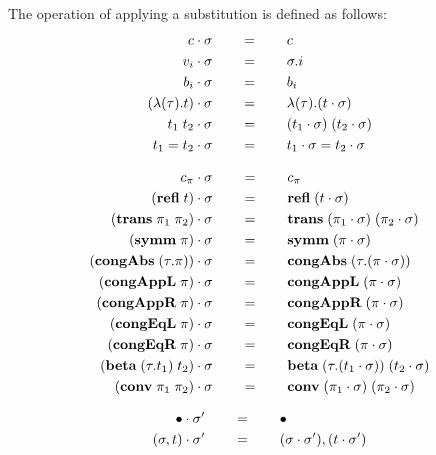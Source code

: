 \documentclass[10pt]{article}
\begin{document}
\begin{mydef}\label{def:stlcd-subst-app}
The operation of applying a substitution is defined as follows:
\\

\begin{align*}
  {c}\cdot{\sigma}      & \qquad = \qquad c\\
  {v_i}\cdot{\sigma}    & \qquad = \qquad \sigma.i\\
  {b_i}\cdot{\sigma}    & \qquad = \qquad b_i\\
  {(\lambda{(\tau)}.{t})}\cdot{\sigma}    & \qquad = \qquad  
    \lambda{(\tau)}.{({t}\cdot{\sigma})}\\
  {t_1\; t_2}\cdot{\sigma}   & \qquad = \qquad
    ({t_1}\cdot{\sigma})\; ({t_2}\cdot{\sigma})\\
  {t_1 = t_2}\cdot{\sigma}   & \qquad = \qquad
    {t_1}\cdot{\sigma} = {t_2}\cdot{\sigma}
\end{align*}

\fbox{$\subst{\pi}{\si}$}
\begin{align*}
  {c_\pi}\cdot{\sigma}      & \qquad = \qquad c_\pi\\
  {(\mbox{\bf refl}\; t)}\cdot{\sigma}       & \qquad = \qquad 
    \mbox{\bf refl}\;({t}\cdot{\sigma})\\
  {(\mbox{\bf trans}\;\pi_1\; \pi_2)}\cdot{\sigma}   & \qquad = \qquad
    \mbox{\bf trans}\;({\pi_1}\cdot{\sigma})\; ({\pi_2}\cdot{\sigma})\\
  {(\mbox{\bf symm}\; \pi)}\cdot{\sigma}  & \qquad = \qquad
    \mbox{\bf symm}\; ({\pi}\cdot{\sigma})\\
  {(\mbox{\bf congAbs}\;(\tau.\pi))}\cdot{\sigma}   & \qquad = \qquad
    \mbox{\bf congAbs}\;(\tau.({\pi}\cdot{\sigma}))\\
  {(\mbox{\bf congAppL}\;\pi)}\cdot{\sigma}  & \qquad = \qquad
    \mbox{\bf congAppL}\;({\pi}\cdot{\sigma})\\
  {(\mbox{\bf congAppR}\;\pi)}\cdot{\sigma}  & \qquad = \qquad
    \mbox{\bf congAppR}\;({\pi}\cdot{\sigma})\\
  {(\mbox{\bf congEqL}\;\pi)}\cdot{\sigma}  & \qquad = \qquad
    \mbox{\bf congEqL}\;({\pi}\cdot{\sigma})\\
  {(\mbox{\bf congEqR}\;\pi)}\cdot{\sigma}  & \qquad = \qquad
    \mbox{\bf congEqR}\;({\pi}\cdot{\sigma})\\
  {(\mbox{\bf beta}\;(\tau.t_1)\; t_2)}\cdot{\sigma}  & \qquad = \qquad
    \mbox{\bf beta}\;(\tau.({t_1}\cdot{\sigma}))\; ({t_2}\cdot{\sigma})\\
  {(\mbox{\bf conv}\; \pi_1\; \pi_2)}\cdot{\sigma}  & \qquad = \qquad
    \mbox{\bf conv}\; ({\pi_1}\cdot{\sigma})\; ({\pi_2}\cdot{\sigma})
\end{align*}

\begin{align*}
  {\bullet}\cdot{\sigma'} & \qquad = \qquad \bullet\\
  {(\sigma,t)}\cdot{\sigma'} & \qquad = \qquad ({\sigma}\cdot{\sigma'}), ({t}\cdot{\sigma'})
\end{align*}
\end{mydef}
\end{document}
